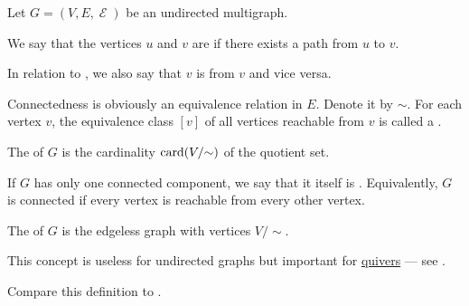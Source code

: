 \begin{definition}\label{def:undirected_multigraph_connectedness}
  Let \( G = (V, E, \mscrE) \) be an undirected multigraph.

  \begin{thmenum}
     We say that the vertices \( u \) and \( v \) are  if there exists a path from \( u \) to \( v \).

    In relation to , we also say that \( v \) is  from \( v \) and vice versa.

     Connectedness is obviously an equivalence relation in \( E \). Denote it by \( {\sim} \). For each vertex \( v \), the equivalence class \( [v] \) of all vertices reachable from \( v \) is called a .

    The  of \( G \) is the cardinality \( \operatorname{card}(V / {\sim}) \) of the quotient set.

    If \( G \) has only one connected component, we say that it itself is . Equivalently, \( G \) is connected if every vertex is reachable from every other vertex.

     The  of \( G \) is the edgeless graph with vertices \( V / {\sim} \).

    This concept is useless for undirected graphs but important for \hyperref[def:quiver]{quivers} --- see .
  \end{thmenum}

  Compare this definition to .
\end{definition}
